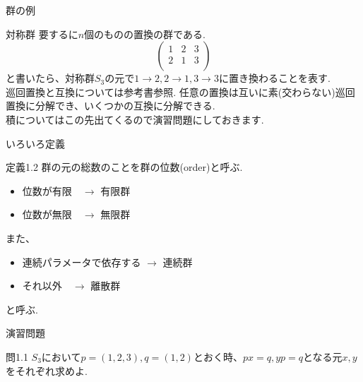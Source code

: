 \documentclass[dvipdfmx,11pt,notheorems]{beamer}
\begin{document}
\begin{frame}{群の例}
  \begin{exampleblock}{対称群}
    要するに$n$個のものの置換の群である. \\
    \begin{equation*}
      \begin{pmatrix}
        1 & 2 & 3 \\
        2 & 1 & 3 \\
      \end{pmatrix}
    \end{equation*}
    と書いたら、対称群$S_3$の元で$1\rightarrow 2,2\rightarrow1,3\rightarrow3$に置き換わることを表す. \\
    \alert{巡回置換}と互換については参考書参照. 任意の置換は互いに素(交わらない)巡回置換に分解でき、いくつかの互換に分解できる. \\
    積についてはこの先出てくるので演習問題にしておきます.
  \end{exampleblock}
\end{frame}
\begin{frame}{いろいろ定義}
  \begin{block}{定義1.2}
    群の元の総数のことを群の\alert{位数}(order)と呼ぶ.
    \begin{itemize}
      \item 位数が有限　$\rightarrow$ \alert{有限群}
      \item 位数が無限　$\rightarrow$ \alert{無限群}
    \end{itemize}
    また、
    \begin{itemize}
      \item 連続パラメータで依存する $\rightarrow$ \alert{連続群}
      \item それ以外　$\rightarrow$ \alert{離散群}
    \end{itemize}
    と呼ぶ.
  \end{block}
\end{frame}
\begin{frame}{演習問題}
  \begin{exampleblock}{問1.1}
    $S_3$において$p=(1,2,3),q=(1,2)$とおく時、$px=q,yp=q$となる元$x,y$をそれぞれ求めよ.
  \end{exampleblock}
\end{frame}
\end{document}
